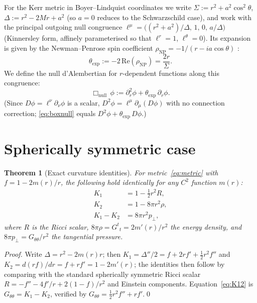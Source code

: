 \documentclass[11pt,a4paper]{article}
\newtheorem{theorem}{Theorem}
\begin{document}
For the Kerr metric in Boyer--Lindquist coordinates we write
$\Sigma:=r^2+a^2\cos^2\!\theta$,\;
$\Delta:=r^2-2Mr+a^2$ (so $a=0$ reduces to the Schwarzschild
case), and work with the principal outgoing null congruence
$\ell^\mu=\bigl((r^2+a^2)/\Delta,\,1,\,0,\,a/\Delta\bigr)$
(Kinnersley form, affinely parameterised so that $\ell^r=1$,
$\ell^\theta=0$).
Its expansion is given by the Newman--Penrose spin coefficient
$\rho_{\scriptscriptstyle\mathrm{NP}}=-1/(r-ia\cos\theta)$
\cite[Sec.~56]{Chandrasekhar1983}:
\begin{equation}\label{eq:theta}
  \theta_{\mathrm{exp}}
  := -2\,\mathrm{Re}(\rho_{\scriptscriptstyle\mathrm{NP}})
  = \frac{2r}{\Sigma}.
\end{equation}
We define the null d'Alembertian for $r$-dependent functions along
this congruence:
\begin{equation}\label{eq:boxnull}
  \Box_{\mathrm{null}}\,\phi
  := \partial_r^2\phi + \theta_{\mathrm{exp}}\,\partial_r\phi.
\end{equation}
(Since $D\phi=\ell^\nu\partial_\nu\phi$ is a scalar,
$D^2\phi=\ell^\mu\partial_\mu(D\phi)$ with no connection correction;
\eqref{eq:boxnull} equals $D^2\phi+\theta_{\mathrm{exp}}\,D\phi$.)

\section{Spherically symmetric case}

\begin{theorem}[Exact curvature identities]\label{thm:spherical}
For metric~\eqref{eq:metric} with $f=1-2m(r)/r$,
the following hold identically for any $C^2$ function $m(r)$:
\begin{align}
  K_1 &= 1 - \tfrac{1}{2}r^2 R, \label{eq:K1R}\\
  K_2 &= 1 - 8\pi r^2\rho,       \label{eq:K2rho}\\
  K_1-K_2 &= 8\pi r^2 p_{\!\perp},  \label{eq:K12}
\end{align}
where $R$ is the Ricci scalar, $8\pi\rho=G^t{}_t=2m'(r)/r^2$
the energy density, and $8\pi p_{\!\perp}=G_{\theta\theta}/r^2$
the tangential pressure.
\end{theorem}

\begin{proof}
Write $\Delta=r^2-2m(r)r$; then $K_1=\Delta''/2=f+2rf'+\tfrac{1}{2}r^2f''$ and
$K_2=d(rf)/dr=f+rf'=1-2m'(r)$; the identities then follow by
comparing with the standard spherically symmetric Ricci
scalar $R=-f''-4f'/r+2(1-f)/r^2$ and Einstein components.
Equation~\eqref{eq:K12} is $G_{\theta\theta}=K_1-K_2$,
verified by $G_{\theta\theta}=\tfrac{1}{2}r^2f''+rf'$.\qed
\end{proof}
\end{document}
